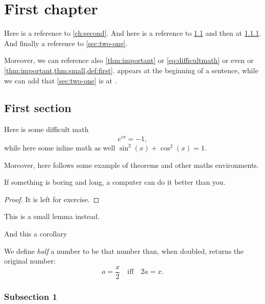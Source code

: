 \chapter{First chapter}
Here is a reference to \cref{ch:second}. And here is a reference to \cref{sec:one-one} and then at \cref{sub:one-one-one}. And finally a reference to \cref{sec:two-one}.

Moreover, we can reference also \cref{thm:important} or \cref{eq:difficultmath} or even  or \cref{thm:important,thm:small,def:first}.  appears at the beginning of a sentence, while we can add that \cref{sec:two-one} is at .

\lipsum[1-3]

\section{First section}\label{sec:one-one}
Here is some difficult math
\begin{equation}\label{eq:difficultmath}
    e^{i\pi} = - 1,
\end{equation}
while here some inline math as well $\sin^2(x) + \cos^2(x) = 1$.

Moreover, here follows some example of theorems and other maths environments.
\begin{theorem}\label{thm:important}
    If something is boring and long, a computer can do it better than you.
\end{theorem}
\begin{proof}
    It is left for exercise.
\end{proof}

\begin{lemma}\label{thm:small}
    This is a small lemma instead.
\end{lemma}
\begin{corollary}\label{thm:corollary}
    And this a corollary
\end{corollary}
\begin{definition}\label{def:first}
    We define \emph{half} a number to be that number than, when doubled, returns the original number:
    \begin{equation}
        a = \frac{x}{2} \quad \text{iff} \quad 2a = x.
    \end{equation}
\end{definition}

\subsection{Subsection 1}\label{sub:one-one-one}
\lipsum[7-8]

